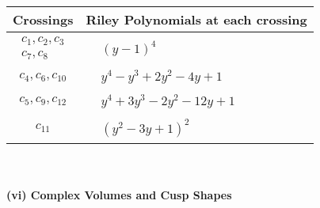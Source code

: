 \documentclass[1p]{elsarticle_modified}
\theoremstyle{definition}
\begin{document}
\begin{tabular}{m{50pt}|m{274pt}}
Crossings & \hspace{64pt}Riley Polynomials at each crossing \\
\hline $$\begin{aligned}c_{1},c_{2},c_{3}\\c_{7},c_{8}\end{aligned}$$&$\begin{aligned}
&(y-1)^4
\end{aligned}$\\
\hline $$\begin{aligned}c_{4},c_{6},c_{10}\end{aligned}$$&$\begin{aligned}
&y^4- y^3+2 y^2-4 y+1
\end{aligned}$\\
\hline $$\begin{aligned}c_{5},c_{9},c_{12}\end{aligned}$$&$\begin{aligned}
&y^4+3 y^3-2 y^2-12 y+1
\end{aligned}$\\
\hline $$\begin{aligned}c_{11}\end{aligned}$$&$\begin{aligned}
&(y^2-3 y+1)^2
\end{aligned}$\\
\hline
\end{tabular}\\~\\
\newpage\flushleft \textbf{(vi) Complex Volumes and Cusp Shapes}
\end{document}
